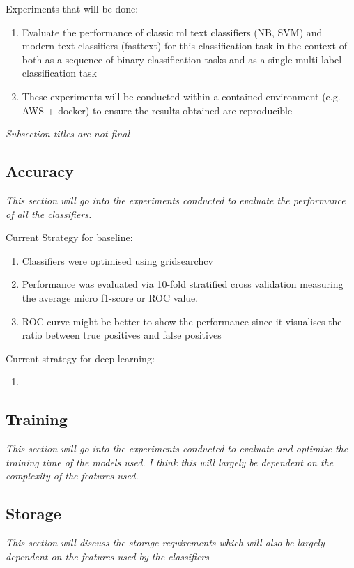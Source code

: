 \documentclass[a4paper,twoside,phd]{BYUPhys}
\begin{document}
Experiments that will be done:
\begin{enumerate}[-]
	\item Evaluate the performance of classic ml text classifiers (NB, SVM) and modern text classifiers (fasttext) for this classification task in the context of both as a sequence of binary classification tasks and as a single multi-label classification task
	\item These experiments will be conducted within a contained environment (e.g. AWS + docker) to ensure the results obtained are reproducible 
\end{enumerate}

\textit{Subsection titles are not final}
\subsection{Accuracy}
\label{sec:AccuracyExperiments}
\textit{This section will go into the experiments conducted to evaluate the performance of all the classifiers.}

Current Strategy for baseline:
\begin{enumerate}[-]
	\item Classifiers were optimised using gridsearchcv
	\item Performance was evaluated via 10-fold stratified cross validation measuring the average micro f1-score or ROC value.
	\item ROC curve might be better to show the performance since it visualises the ratio between true positives and false positives
\end{enumerate}

Current strategy for deep learning:
\begin{enumerate}[-]
	\item 
\end{enumerate}

\subsection{Training}
\label{sec:TrainingExperiments}
\textit{This section will go into the experiments conducted to evaluate and optimise the training time of the models used. I think this will largely be dependent on the complexity of the features used.}

\subsection{Storage}
\label{sec:StorageExperiments}
\textit{This section will discuss the storage requirements which will also be largely dependent on the features used by the classifiers}
\end{document}

